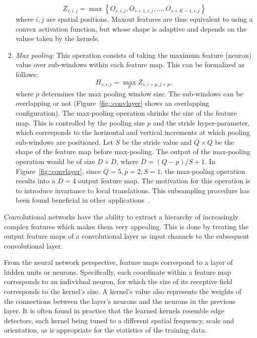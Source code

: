 \documentclass[final,5p,times,twocolumn]{elsarticle}
\begin{document}
\begin{enumerate}
%
\begin{equation}
Z_{s,i,j} = \max \left \{ O_{s,i,j}, O_{s+1,i,j},..., O_{s+K-1,i,j} \right \}
\end{equation}
%
where $i,j$ are spatial positions. Maxout features are thus equivalent to using a convex activation function, but whose shape is adaptive and depends on the values taken by the kernels.


\item {\it Max pooling:} This operation consists of taking the maximum feature (neuron) value over sub-windows within each feature map. This can be formalized as follows:
%
\begin{equation}
H_{s,i,j} = \max_{p} Z_{s,i+p,j+p} , 
\end{equation} 
%
where $p$ determines the max pooling window size.  The sub-windows can be overlapping or not (Figure~\ref{fig::convlayer} shows an overlapping configuration). The max-pooling operation shrinks the size of the feature map. This is controlled by the pooling size $p$ and the stride hyper-parameter, which corresponds to the horizontal and vertical increments at which pooling sub-windows are positioned. Let $S$ be the stride value and $Q\times Q$ be the shape of the feature map before max-pooling. The output of the max-pooling operation would be of size $D \times D$, where $D = (Q-p)/S+1$.  In Figure~\ref{fig::convlayer}, since $Q=5, p=2, S=1$, the max-pooling operation results into a $D=4$ output feature map.
The motivation for this operation is to introduce invariance to local translations. This subsampling procedure has been found beneficial in other applications~\citep{Krizhevsky-2012-small}. 


\end{enumerate}



Convolutional networks have the ability to extract a hierarchy of increasingly complex features which makes them very appealing. This is done by treating the output feature maps of a convolutional layer as input channels to the subsequent convolutional layer. 


From the neural network perspective, feature maps correspond to a layer of hidden units or neurons. Specifically, each coordinate within a feature map corresponds to an individual neuron, for which the size of its receptive field corresponds to the kernel's size. A kernel's value also represents the weights of the connections between the layer's neurons and the neurons in the previous layer. It is often found in practice that the learned kernels resemble edge detectors, each kernel being tuned to a different spatial frequency, scale and orientation, as is appropriate for the statistics of the training data. 
\end{document}
